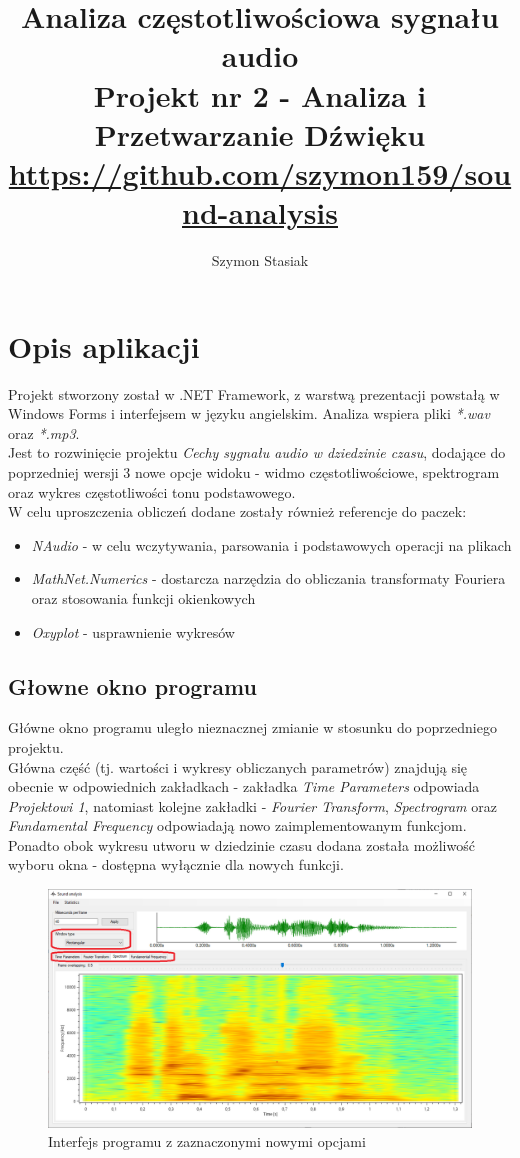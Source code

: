 \documentclass[a4paper]{article}
\title{Analiza częstotliwościowa sygnału audio\\
\large Projekt nr 2 - Analiza i Przetwarzanie Dźwięku\\ 
\small \url{https://github.com/szymon159/sound-analysis}}
\date{}
\author{Szymon Stasiak}
\begin{document}
  \maketitle

\section{Opis aplikacji}
Projekt stworzony został w .NET Framework, z warstwą prezentacji powstałą w Windows Forms i interfejsem w języku angielskim. Analiza wspiera pliki \textit{*.wav} oraz \textit{*.mp3}.\\
Jest to rozwinięcie projektu \textit{Cechy sygnału audio w dziedzinie czasu}, dodające do poprzedniej wersji 3 nowe opcje widoku - widmo częstotliwościowe, spektrogram oraz wykres częstotliwości tonu podstawowego.\\
W celu uproszczenia obliczeń dodane zostały również referencje do paczek:
\begin{itemize}
\item \textit{NAudio} - w celu wczytywania, parsowania i podstawowych operacji na plikach
\item \textit{MathNet.Numerics} - dostarcza narzędzia do obliczania transformaty Fouriera oraz stosowania funkcji okienkowych
\item \textit{Oxyplot} - usprawnienie wykresów
\end{itemize}

\subsection{Głowne okno programu}
Główne okno programu uległo nieznacznej zmianie w stosunku do poprzedniego projektu.\\
Główna część (tj. wartości i wykresy obliczanych parametrów) znajdują się obecnie w odpowiednich zakładkach - zakładka \textit{Time Parameters} odpowiada \textit{Projektowi 1}, natomiast kolejne zakładki - \textit{Fourier Transform}, \textit{Spectrogram} oraz \textit{Fundamental Frequency} odpowiadają nowo zaimplementowanym funkcjom.\\
Ponadto obok wykresu utworu w dziedzinie czasu dodana została możliwość wyboru okna - dostępna wyłącznie dla nowych funkcji.
\begin{figure}[H]
  \includegraphics[width=\linewidth]{images/01interface.png}
  \caption{Interfejs programu z zaznaczonymi nowymi opcjami}
\end{figure}
\end{document}
